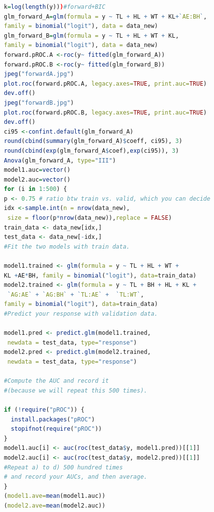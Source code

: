 \documentclass[12pt,a4paper]{article}
\begin{document}
\begin{lstlisting}[language =R]
k=log(length(y)))#forward+BIC
glm_forward_A=glm(formula = y ~ TL + HL + WT + KL+`AE:BH`, 
family = binomial("logit"), data = data_new)
glm_forward_B=glm(formula = y ~ TL + HL + WT + KL, 
family = binomial("logit"), data = data_new)
forward.pROC.A <-roc(y~ fitted(glm_forward_A))
forward.pROC.B <-roc(y~ fitted(glm_forward_B))
jpeg("forwardA.jpg")
plot.roc(forward.pROC.A, legacy.axes=TRUE, print.auc=TRUE)
dev.off()
jpeg("forwardB.jpg")
plot.roc(forward.pROC.B, legacy.axes=TRUE, print.auc=TRUE)
dev.off()
ci95 <-confint.default(glm_forward_A)
round(cbind(summary(glm_forward_A)$coeff, ci95), 3)
round(cbind(exp(glm_forward_A$coef),exp(ci95)), 3)
Anova(glm_forward_A, type="III")
model1.auc=vector()
model2.auc=vector()
for (i in 1:500) {
p <- 0.75 # ratio btw train vs. valid, which you can decide
idx <-sample.int(n = nrow(data_new),
 size = floor(p*nrow(data_new)),replace = FALSE)
train_data <- data_new[idx,]
test_data <- data_new[-idx,]
#Fit the two models with train data.

model1.trained <- glm(formula = y ~ TL + HL + WT + 
KL +AE*BH, family = binomial("logit"), data=train_data)
model2.trained <- glm(formula = y ~ TL + BH + HL + KL +
 `AG:AE` + `AG:BH` + `TL:AE` +  `TL:WT`, 
family = binomial("logit"), data=train_data)
#Predict your response with validation data.

model1.pred <- predict.glm(model1.trained,
 newdata = test_data, type="response")
model2.pred <- predict.glm(model2.trained,
 newdata = test_data, type="response")

#Compute the AUC and record it 
#(because we will repeat this 500 times).

if (!require("pROC")) {
  install.packages("pROC")
  stopifnot(require("pROC"))
}
model1.auc[i] <- auc(roc(test_data$y, model1.pred))[[1]] 
model2.auc[i] <- auc(roc(test_data$y, model2.pred))[[1]] 
#Repeat a) to d) 500 hundred times
# and record your AUCs, and then average.
}
(model1.ave=mean(model1.auc))
(model2.ave=mean(model2.auc))
\end{lstlisting}
\newpage
\end{document}
